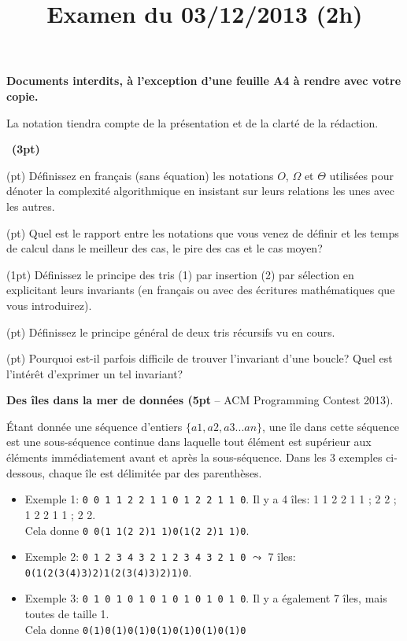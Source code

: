 \documentclass[10pt]{article}\usepackage[nu]{esial}
\begin{document}
\title{Examen du 03/12/2013 (2h)}
\maketitle

\begin{centering}
  \textbf{\large Documents interdits, à l'exception d'une feuille A4 à rendre
    avec votre copie.}

\end{centering}
\centerline{La notation tiendra compte de la présentation et de la clarté de
  la rédaction.}
\bigskip



\QuestionCours~\textbf{(3pt)}

\Question(\textonehalf pt) Définissez en français (sans équation) les notations
$O$, $\Omega$ et $\Theta$ utilisées pour dénoter la complexité algorithmique en
insistant sur leurs relations les unes avec les autres.

\Question(\textonehalf pt) Quel est le rapport entre les notations que vous venez de définir et
les temps de calcul dans le meilleur des cas, le pire des cas et le cas moyen? 

\Question(1pt) Définissez le principe des tris (1) par insertion (2) par
sélection en explicitant leurs invariants (en français ou avec des écritures
mathématiques que vous introduirez).

\Question(\textonehalf pt) Définissez le principe général de deux tris récursifs
vu en cours.

\Question(\textonehalf pt) Pourquoi est-il parfois difficile de trouver
l'invariant d'une boucle? Quel est l'intérêt d'exprimer un tel invariant?

\Exercice\textbf{Des îles dans la mer de données {\rm(}5pt} -- ACM Programming Contest 2013).

Étant donnée une séquence d'entiers $\{a1, a2, a3 ... an\}$, une île dans cette
séquence est une sous-séquence continue dans laquelle tout élément est supérieur
aux éléments immédiatement avant et après la sous-séquence.  Dans les 3 exemples
ci-dessous, chaque île est délimitée par des parenthèses.

\begin{itemize}
\item Exemple 1:  \texttt{0 0 1 1 2 2 1 1 0 1 2 2 1 1 0}.
  Il y a 4 îles: 1 1 2 2 1 1 ; 2 2  ; 1 2 2 1 1 ; 2 2. \\
  Cela donne \hspace{3pt}\texttt{0 0(1 1(2 2)1 1)0(1(2 2)1 1)0}.
\item Exemple 2: \texttt{0 1 2 3 4 3 2 1 2 3 4 3 2 1 0} $\leadsto$ 7 îles:
  \texttt{0(1(2(3(4)3)2)1(2(3(4)3)2)1)0}.
\item Exemple 3: \texttt{0 1 0 1 0 1 0 1 0 1 0 1 0 1 0}. Il y a également 7
  îles, mais toutes de taille 1.\\
  Cela donne \hspace{3pt}\texttt{0(1)0(1)0(1)0(1)0(1)0(1)0(1)0}
\end{itemize}
\end{document}
